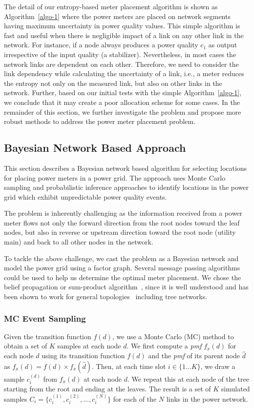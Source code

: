The detail of our entropy-based meter placement algorithm is shown as Algorithm~\ref{algo-1} where the power meters are placed on network segments having maximum uncertainty in power quality values. This simple algorithm is fast and useful when there is negligible impact of a link on any other link in the network. For instance, if a node always produces a power quality $c_1$ as output irrespective of the input quality (a stabilizer). Nevertheless, in most cases the network links are dependent on each other. Therefore, we need to consider the link dependency while calculating the uncertainty of a link, i.e., a meter reduces the entropy not only on the measured link, but also on other links in the network. Further, based on our initial tests with the simple Algorithm~\ref{algo-1}, we conclude that it may create a poor allocation scheme for some cases. In the remainder of this section, we further investigate the problem and propose more robust methods to address the power meter placement problem. 

\subsection{Bayesian Network Based Approach}
\label{sec:predict} 
This section describes a Bayesian network based algorithm for selecting locations for placing power meters in a power grid. The approach uses Monte Carlo sampling and probabilistic inference approaches to identify locations in the power grid which exhibit unpredictable power quality events.

The problem is inherently challenging as the information received from a power meter flows not only the forward direction from the root nodes toward the leaf nodes, but also in reverse or upstream direction toward the root node (utility main) and back to all other nodes in the network. 

To tackle the above challenge, we cast the problem as a Bayesian network and model the power grid using a factor graph. Several message passing algorithms could be used to help us determine the optimal meter placement. We chose the belief propagation or sum-product algorithm~\cite{pearl1988probabilistic}, since it is well understood and has been shown to work for general topologies~\cite{yedidia2001generalized} including tree networks.

\subsubsection{MC Event Sampling}
Given the transition function $f(d)$, we use a Monte Carlo (MC) method to obtain a set of $K$ samples at each node $d$. We first compute a \emph{pmf} $f_x{(d)}$ for each node $d$ using its transition function $f(d)$ and the \emph{pmf} of its parent node $\widehat{d}$ as $f_x(d) = f(d) \times f_x(\widehat{d})$. Then, at each time slot $i \in \{1\ldots K\}$, we draw a sample $c_{i}^{(d)}$ from $f_x(d)$ at each node $d$. We repeat this at each node of the tree starting from the root and ending at the leaves. The result is a set of $K$ simulated samples $C_{i}=\{c_{i}^{(1)},c_{i}^{(2)},\ldots,c_{i}^{(N)}\}$ for each of the $N$ links in the power network. 


